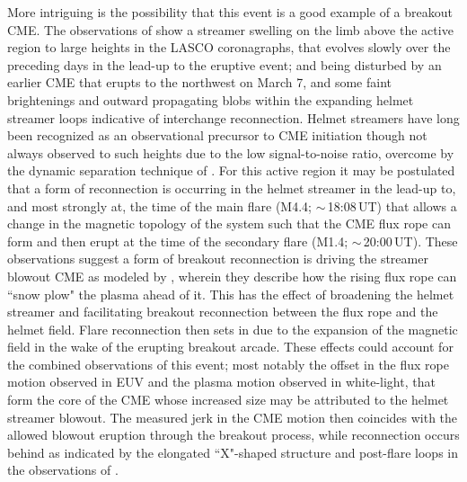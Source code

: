 \documentclass[namedreferences]{solarphysics}
\begin{document}
\begin{article}

More intriguing is the possibility that this event is a good example of a breakout CME. The observations of  show a streamer swelling on the limb above the active region to large heights in the LASCO coronagraphs, that evolves slowly over the preceding days in the lead-up to the eruptive event; and being disturbed by an earlier CME that erupts to the northwest on March 7, and some faint brightenings and outward propagating blobs within the expanding helmet streamer loops indicative of interchange reconnection. Helmet streamers have long been recognized as an observational precursor to CME initiation \cite{1993JGR....9813177H} though not always observed to such heights due to the low signal-to-noise ratio, overcome by the dynamic separation technique of . For this active region it may be postulated that a form of reconnection is occurring in the helmet streamer in the lead-up to, and most strongly at, the time of the main flare (M4.4; $\sim$\,18:08\,UT) that allows a change in the magnetic topology of the system such that the CME flux rope can form and then erupt at the time of the secondary flare (M1.4; $\sim$\,20:00\,UT). These observations suggest a form of breakout reconnection is driving the streamer blowout CME as modeled by , wherein they describe how the rising flux rope can ``snow plow" the plasma ahead of it. This has the effect of broadening the helmet streamer and facilitating breakout reconnection between the flux rope and the helmet field. Flare reconnection then sets in due to the expansion of the magnetic field in the wake of the erupting breakout arcade. These effects could account for the combined observations of this event; most notably the offset in the flux rope motion observed in EUV and the plasma motion observed in white-light, that form the core of the CME whose increased size may be attributed to the helmet streamer blowout. The measured jerk in the CME motion then coincides with the allowed blowout eruption through the breakout process, while reconnection occurs behind as indicated by the elongated ``X"-shaped structure and post-flare loops in the observations of .


\end{article}
\end{document}
